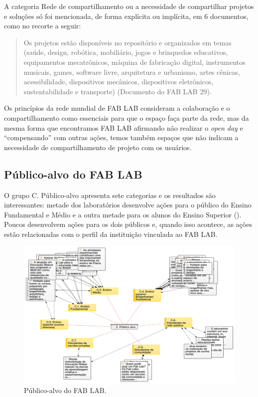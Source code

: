 \documentclass[portuguese]{textolivre}
\begin{document}
A categoria Rede de compartilhamento ou a necessidade de compartilhar projetos e soluções só foi mencionada, de forma explícita ou implícita, em 6 documentos, como no recorte a seguir:

\begin{quote}
    Os projetos estão disponíveis no repositório e organizados em temas (saúde, design, robótica, mobiliário, jogos e brinquedos educativos, equipamentos mecatrônicos, máquina de fabricação digital, instrumentos musicais, games, software livre, arquitetura e urbanismo, artes cênicas, acessibilidade, dispositivos mecânicos, dispositivos eletrônicos, sustentabilidade e transporte) (Documento do FAB LAB 29).
\end{quote}

Os princípios da rede mundial de FAB LAB consideram a colaboração e o compartilhamento como essenciais para que o espaço faça parte da rede, mas da mesma forma que encontramos FAB LAB afirmando não realizar o \textit{open day} e ``compensando'' com outras ações, temos também espaços que não indicam a necessidade de compartilhamento de projeto com os usuários.

\subsection{Público-alvo do FAB LAB}\label{sec-organizacao}
O grupo C. Público-alvo apresenta sete categorias e os resultados são interessantes: metade dos laboratórios desenvolve ações para o público do Ensino Fundamental e Médio e a outra metade para os alunos do Ensino Superior (). Poucos desenvolvem ações para os dois públicos e, quando isso acontece, as ações estão relacionadas com o perfil da instituição vinculada ao FAB LAB.

\begin{figure}
\centering
\begin{minipage}{\textwidth}
\includegraphics[width=\linewidth]{Fig5.png}
\caption{Público-alvo do FAB LAB.}
\label{fig5}
\end{minipage}
\end{figure}
\end{document}
